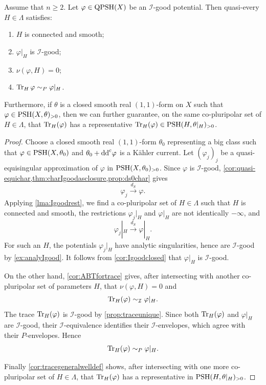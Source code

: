 \begin{corollary}\label{cor:rest_gen_very_good}
Assume that $n\geq 2$.
    Let $\varphi\in \mathrm{QPSH}(X)$ be an $\mathcal{I}$-good potential. Then quasi-every $H\in \Lambda$ satisfies:
    \begin{enumerate}
        \item\label{itm:chapter-trace:L1071:1} $H$ is connected and smooth;
        \item\label{itm:chapter-trace:L1071:2} $\varphi|_H$ is $\mathcal{I}$-good;
        \item\label{itm:chapter-trace:L1071:3} $\nu(\varphi,H)=0$;
        \item\label{itm:chapter-trace:L1071:4} $\operatorname{Tr}_H \varphi\sim_P \varphi|_H$.
    \end{enumerate}
    Furthermore, if $\theta$ is a closed smooth real $(1,1)$-form on $X$ such that $\varphi\in \mathrm{PSH}(X,\theta)_{>0}$, then we can further guarantee, on the same co-pluripolar set of $H\in \Lambda$, that $\operatorname{Tr}_H(\varphi)$ has a representative $\operatorname{Tr}_H(\varphi)\in \mathrm{PSH}(H,\theta|_H)_{>0}$.
\end{corollary}
\begin{proof}
    Choose a closed smooth real $(1,1)$-form $\theta_0$ representing a big class such that $\varphi\in \mathrm{PSH}(X,\theta_0)$ and $\theta_0+\mathrm{dd}^{\mathrm{c}} \varphi$ is a Kähler current. Let $(\varphi_j)_j$ be a quasi-equisingular approximation of $\varphi$ in $\mathrm{PSH}(X,\theta_0)_{>0}$. Since $\varphi$ is $\mathcal I$-good, \cref{cor:quasi-equichar,thm:charIgoodasclosure,prop:ds0char} gives
    \[
        \varphi_j\xrightarrow{d_S}\varphi.
    \]
    Applying \cref{lma:Igoodrest}, we find a co-pluripolar set of $H\in\Lambda$ such that $H$ is connected and smooth, the restrictions $\varphi_j|_H$ and $\varphi|_H$ are not identically $-\infty$, and
    \[
        \varphi_j|_H\xrightarrow{d_S}\varphi|_H.
    \]
    For such an $H$, the potentials $\varphi_j|_H$ have analytic singularities, hence are $\mathcal I$-good by \cref{ex:analyIgood}. It follows from \cref{cor:Igoodclosed} that $\varphi|_H$ is $\mathcal I$-good.

    On the other hand, \cref{cor:ABTfortrace} gives, after intersecting with another co-pluripolar set of parameters $H$, that $\nu(\varphi,H)=0$ and
    \[
        \operatorname{Tr}_H(\varphi)\sim_{\mathcal I}\varphi|_H.
    \]
    The trace $\operatorname{Tr}_H(\varphi)$ is $\mathcal I$-good by \cref{prop:traceunique}. Since both $\operatorname{Tr}_H(\varphi)$ and $\varphi|_H$ are $\mathcal I$-good, their $\mathcal I$-equivalence identifies their $\mathcal I$-envelopes, which agree with their $P$-envelopes. Hence
    \[
        \operatorname{Tr}_H(\varphi)\sim_P\varphi|_H.
    \]

    Finally \cref{cor:tracegeneralwelldef} shows, after intersecting with one more co-pluripolar set of $H\in\Lambda$, that $\operatorname{Tr}_H(\varphi)$ has a representative in $\mathrm{PSH}(H,\theta|_H)_{>0}$.
\end{proof}


